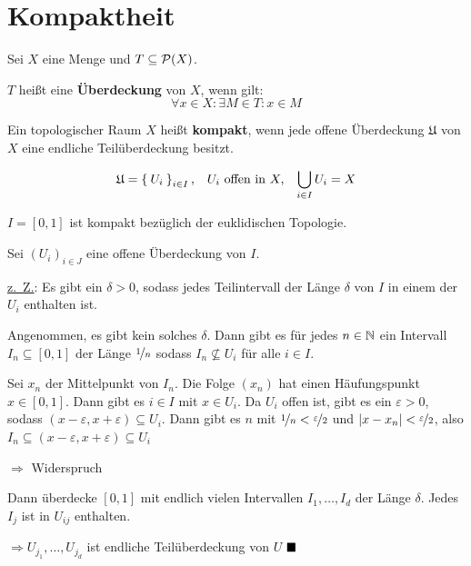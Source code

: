 \section{Kompaktheit}
\begin{definition}
    Sei $X$ eine Menge und $T \subseteq \mathcal{P}(X)$.

    $T$ heißt eine \textbf{Überdeckung} von $X$, wenn gilt:
    \[\forall x \in X: \exists M \in T: x \in M\]
\end{definition}

\begin{definition}
    Ein topologischer Raum $X$ heißt \textbf{kompakt}, wenn jede
    offene Überdeckung $\mathfrak{U}$ von $X$ eine endliche Teilüberdeckung besitzt.

    \[\mathfrak{U} = \Set{U_i}_{i \in I},\;\;\;U_i \text{ offen in } X,\;\;\;\bigcup_{i \in I} U_i = X\]
    
\end{definition}


\begin{bemerkung}\label{abgeschlossen01IstKompakt}
    $I = [0, 1]$ ist kompakt bezüglich der euklidischen Topologie.
\end{bemerkung}

\begin{beweis}
    Sei $(U_i)_{i \in J}$ eine offene Überdeckung von $I$.

\underline{z.~Z.}: Es gibt ein $\delta > 0$, sodass jedes Teilintervall
    der Länge $\delta$ von $I$ in einem der $U_i$ enthalten ist. 

Angenommen, es gibt kein solches $\delta$. Dann gibt es für jedes 
$n \in \mathbb{N}$ ein Intervall $I_n \subseteq [0,1]$ der Länge $\nicefrac{1}{n}$
sodass $I_n \not\subseteq U_i$ für alle $i \in I$.

Sei $x_n$ der Mittelpunkt von $I_n$. Die Folge $(x_n)$ hat einen 
Häufungspunkt $x \in [0,1]$. Dann gibt es $i \in I$ mit $x \in U_i$.
Da $U_i$ offen ist, gibt es ein $\varepsilon > 0$, sodass $(x - \varepsilon, x + \varepsilon) \subseteq U_i$.
Dann gibt es $n$ mit $\nicefrac{1}{n} < \nicefrac{\varepsilon}{2}$ und
$|x - x_n| < \nicefrac{\varepsilon}{2}$, also $I_n \subseteq (x - \varepsilon, x + \varepsilon) \subseteq U_i$

$\Rightarrow$ Widerspruch 

Dann überdecke $[0,1]$ mit endlich vielen Intervallen $I_1, \dots, I_d$
der Länge $\delta$. Jedes $I_j$ ist in $U_{ij}$ enthalten.

$\Rightarrow U_{j_1}, \dots, U_{j_d}$ ist endliche Teilüberdeckung von $U$
$\qed$
\end{beweis}

